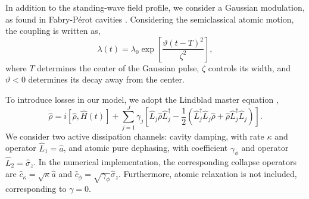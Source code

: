 \documentclass[aps,pre,superscriptaddress,twocolumn,10pt]{revtex4-2}
\begin{document}
In addition to the standing-wave field profile, we consider a Gaussian modulation, as found in Fabry-Pérot cavities \cite{Brune1996,VidiellaBarranco2025}. Considering the semiclassical atomic motion, the coupling is written as,
\begin{equation}
\label{eq:gaussian_coup}
    \lambda(t)=\lambda_0
    \exp\left[\frac{\vartheta(t-T)^2}{\zeta^2}\right],
\end{equation}
where $T$ determines the center of the Gaussian pulse, $\zeta$ controls its width, and $\vartheta<0$ determines its decay away from the center.

 
 
To introduce losses in our model, we adopt the Lindblad master equation \cite{Lindblad1976,Breuer2007,Manzano2020}, 
 \begin{equation}
     \dot{\hat{\rho}}=i\left[\hat{\rho},\hat{H}(t)\right]+\sum_{j=1}^J \gamma_j \left[ {\hat{L}_j}\hat{\rho}{\hat{L}^\dagger_j} - \frac{1}{2} \left({\hat{L}^\dagger_j} {\hat{L}_j} \hat{\rho} + \hat{\rho}{\hat{L}^\dagger_j} {\hat{L}_j} \right) \right].
 \end{equation}
We consider two active dissipation channels: cavity damping, with rate $\kappa$ and operator $\hat L_1=\hat a$, and atomic pure dephasing, with coefficient $\gamma_\phi$ and operator $\hat L_2=\hat\sigma_z$. In the numerical implementation, the corresponding collapse operators are $\hat c_\kappa=\sqrt{\kappa}\hat a$ and $\hat c_\phi=\sqrt{\gamma_\phi}\hat\sigma_z$. Furthermore, atomic relaxation is not included, corresponding to $\gamma=0$.
\end{document}
